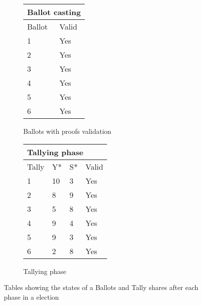 \begin{figure}[H]
    \centering
    \captionsetup[subfigure]{labelformat=empty}
    \begin{subfigure}[b]{0.45\textwidth}
        \begin{table}[H]
            \centering
            \begin{tabular}{|l|l|}
                \hline
                \multicolumn{2}{|l|}{Ballot casting} \\ \hline
                Ballot   & Valid              \\ \hline
                1        & Yes                \\ \hline
                2        & Yes                \\ \hline
                3        & Yes                \\ \hline
                4        & Yes                \\ \hline
                5        & Yes                \\ \hline
                6        & Yes                \\ \hline
            \end{tabular}
        \end{table}
        \caption{Ballots with proofs validation}
    \end{subfigure}
    \qquad %
    \qquad %
    \begin{subfigure}[b]{0.40\textwidth}
        \begin{table}[H]
            \centering
            \begin{tabular}{|l|l|l|l|}
                \hline
                \multicolumn{4}{|l|}{Tallying phase}               \\ \hline
                Tally & Y* & S* & Valid                    \\ \hline
                1     & 10 & 3  & Yes                      \\ \hline
                2     & 8  & 9  & Yes                      \\ \hline
                3     & 5  & 8  & Yes                      \\ \hline
                4     & 9  & 4  & Yes                      \\ \hline
                5     & 9  & 3  & Yes                      \\ \hline
                6     & 2  & 8  & Yes                      \\ \hline
            \end{tabular}
        \end{table}
        \caption{Tallying phase}
    \end{subfigure}
    \caption{Tables showing the states of a Ballots and Tally shares after each phase in a election}
    \label{fig:discussion:individual_verifiability}
\end{figure}







